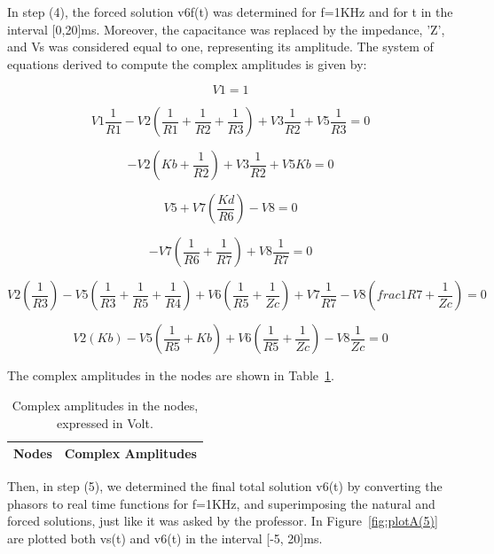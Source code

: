 In step (4), the forced solution v6f(t) was determined for f=1KHz and for t in the interval [0,20]ms. Moreover, the capacitance was replaced by the impedance, 'Z', and Vs was considered equal to one, representing its amplitude.
The system of equations derived to compute the complex amplitudes is given by: 

\begin{equation}
  V1 = 1
\end{equation}

\begin{equation}
  V1\frac{1}{R1} -V2(\frac{1}{R1}+\frac{1}{R2}+\frac{1}{R3})  + V3\frac{1}{R2} + V5\frac{1}{R3} = 0
\end{equation}

\begin{equation}
  -V2(Kb+\frac{1}{R2}) +V3\frac{1}{R2} + V5Kb = 0
\end{equation}

\begin{equation}
  V5 + V7(\frac{Kd}{R6}) - V8= 0
\end{equation}

\begin{equation}
  -V7(\frac{1}{R6}+\frac{1}{R7}) + V8\frac{1}{R7}= 0
\end{equation}

\begin{equation}
  V2(\frac{1}{R3})  - V5(\frac{1}{R3} +\frac{1}{R5} +\frac{1}{R4}) + V6(\frac{1}{R5} + \frac{1}{Zc}) + V7\frac{1}{R7} - V8(frac{1}{R7} + \frac{1}{Zc}) = 0
\end{equation}

\begin{equation}
   V2(Kb)  - V5(\frac{1}{R5} +Kb) + V6(\frac{1}{R5} + \frac{1}{Zc}) - V8\frac{1}{Zc} = 0
\end{equation}

The complex amplitudes in the nodes are shown in Table~\ref{tab:TA4}.

\begin{table}[h]
  \centering
  \begin{tabular}{|l|r|}
    \hline    
    {\bf Nodes} & {\bf Complex Amplitudes} \\ \hline
    
  \end{tabular}
  \caption{Complex amplitudes in the nodes, expressed in Volt.}
  \label{tab:TA4}
\end{table}

Then, in step (5), we determined the final total solution v6(t) by converting the phasors to real time functions for f=1KHz, and superimposing the natural and forced solutions, just like it was asked by the professor. In Figure~\ref{fig:plotA(5)} are plotted both vs(t) and v6(t) in the interval [-5, 20]ms.

